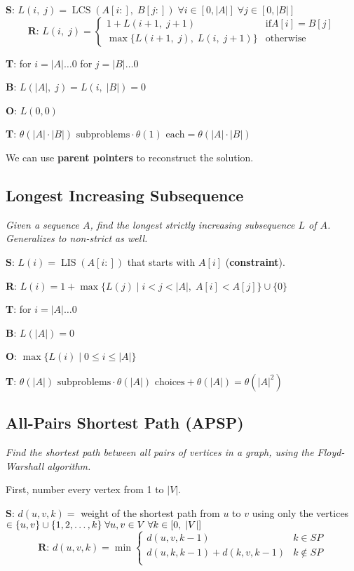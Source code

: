 \textbf{S}: $L(i, \; j) = \operatorname{LCS}(A[i:], \; B[j:]) \; \forall i \in [0, |A|] \; \forall j \in [0, |B|]$\\[-0.2em]
\[ \textbf{R}\text{: } L(i, \; j) = \begin{cases} 
    1 + L(i + 1, \; j + 1) & \text{if} A[i] = B[j] \\
    \max\{L(i + 1, \; j), \; L(i, \; j + 1)\} & \text{otherwise}
 \end{cases}
\]

\textbf{T}: for $i = |A| \dots 0$ for $j = |B| \dots 0$

\textbf{B}: $L(|A|, \; j) = L(i, \; |B|) = 0$

\textbf{O}: $L(0, 0)$

\textbf{T}: $\theta(|A| \cdot |B|) \text{ subproblems} \cdot \theta(1) \text{ each} = \theta(|A| \cdot |B|)$

We can use \textbf{parent pointers} to reconstruct the solution.

\subsection{Longest Increasing Subsequence}
\emph{Given a sequence $A$, find the longest strictly increasing subsequence $L$ of $A$. Generalizes to non-strict as well.}

\textbf{S}: $L(i) = \operatorname{LIS}(A[i:])$ that starts with $A[i]$ (\textbf{constraint}).

\textbf{R}: $L(i) = 1 + \max \{ L(j) \; | \; i < j < |A|, \; A[i] < A[j] \} \cup \{ 0 \}$

\textbf{T}: for $i = |A| \dots 0$

\textbf{B}: $L(|A|) = 0$

\textbf{O}: $\max \{ L(i) \; | \; 0 \leq i \leq |A| \}$

\textbf{T}: $\theta(|A|) \text{ subproblems} \cdot \theta(|A|) \text{ choices} + \theta(|A|) = \theta(|A|^2)$

\subsection{All-Pairs Shortest Path (APSP)}
\emph{Find the shortest path between all pairs of vertices in a graph, using the Floyd-Warshall algorithm.}

First, number every vertex from 1 to $|V|$.

\textbf{S}: $d(u, v, k) =$ weight of the shortest path from $u$ to $v$ using only the vertices $\in \{ u, v \} \cup \{ 1, 2, \dots, k \} \linebreak \;
\forall u, v \in V \; \forall k \in [0, \; |V|]$\\[-0.2em]
\[ \textbf{R}\text{: } d(u, v, k) = \min \begin{cases} 
    d(u, v, k - 1) & k \in SP \\
    d(u, k, k - 1) + d(k, v, k - 1) & k \notin SP \\
 \end{cases}
\]

